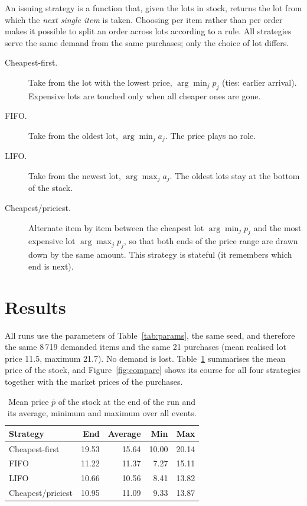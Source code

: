 \documentclass[11pt,a4paper]{article}
\begin{document}
An issuing strategy is a function that, given the lots in stock, returns the
lot from which the \emph{next single item} is taken. Choosing per item rather
than per order makes it possible to split an order across lots according to a
rule. All strategies serve the same demand from the same purchases; only the
choice of lot differs.

\begin{description}
  \item[Cheapest-first.] Take from the lot with the lowest price,
        $\arg\min_j p_j$ (ties: earlier arrival). Expensive lots are touched
        only when all cheaper ones are gone.
  \item[FIFO.] Take from the oldest lot, $\arg\min_j a_j$. The price plays no
        role.
  \item[LIFO.] Take from the newest lot, $\arg\max_j a_j$. The oldest lots
        stay at the bottom of the stack.
  \item[Cheapest/priciest.] Alternate item by item between the cheapest lot
        $\arg\min_j p_j$ and the most expensive lot $\arg\max_j p_j$, so that
        both ends of the price range are drawn down by the same amount. This
        strategy is stateful (it remembers which end is next).
\end{description}

\section{Results}

All runs use the parameters of Table~\ref{tab:params}, the same seed, and
therefore the same 8\,719 demanded items and the same 21 purchases (mean
realised lot price 11.5, maximum 21.7). No demand is lost. Table~\ref{tab:results}
summarises the mean price of the stock, and Figure~\ref{fig:compare} shows its
course for all four strategies together with the market prices of the
purchases.

\begin{table}[ht]
\centering
\begin{tabular}{lrrrr}
\toprule
Strategy & End & Average & Min & Max \\
\midrule
Cheapest-first    & 19.53 & 15.64 & 10.00 & 20.14 \\
FIFO              & 11.22 & 11.37 &  7.27 & 15.11 \\
LIFO              & 10.66 & 10.56 &  8.41 & 13.82 \\
Cheapest/priciest & 10.95 & 11.09 &  9.33 & 13.87 \\
\bottomrule
\end{tabular}
\caption{Mean price $\bar p$ of the stock at the end of the run and its
average, minimum and maximum over all events.}
\label{tab:results}
\end{table}
\end{document}
